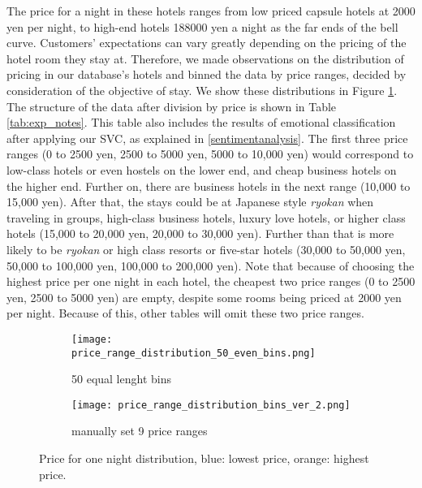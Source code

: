 \documentclass[smallextended,natbib]{svjour3}       %
\begin{document}
    The price for a night in these hotels ranges from low priced capsule hotels at 2000 yen per night, to high-end hotels \num[group-separator={,}]{188000} yen a night as the far ends of the bell curve. Customers' expectations can vary greatly depending on the pricing of the hotel room they stay at. Therefore, we made observations on the distribution of pricing in our database's hotels and binned the data by price ranges, decided by consideration of the objective of stay. We show these distributions in Figure \ref{fig:price_dist}. The structure of the data after division by price is shown in Table \ref{tab:exp_notes}. This table also includes the results of emotional classification after applying our SVC, as explained in \ref{sentimentanalysis}. The first three price ranges (0 to 2500 yen, 2500 to 5000 yen, 5000 to 10,000 yen) would correspond to low-class hotels or even hostels on the lower end, and cheap business hotels on the higher end. Further on, there are business hotels in the next range (10,000 to 15,000 yen). After that, the stays could be at Japanese style \textit{ryokan} when traveling in groups, high-class business hotels, luxury love hotels, or higher class hotels (15,000 to 20,000 yen, 20,000 to 30,000 yen). Further than that is more likely to be \textit{ryokan} or high class resorts or five-star hotels (30,000 to 50,000 yen, 50,000 to 100,000 yen, 100,000 to 200,000 yen). Note that because of choosing the highest price per one night in each hotel, the cheapest two price ranges (0 to 2500 yen, 2500 to 5000 yen) are empty, despite some rooms being priced at 2000 yen per night. Because of this, other tables will omit these two price ranges.

    \begin{figure}[ht]
        \centering
        \begin{subfigure}[b]{0.45\textwidth}
            \texttt{[image: price\_range\_distribution\_50\_even\_bins.png]}
            \caption{50 equal lenght bins}
        \end{subfigure}
        \begin{subfigure}[b]{0.45\textwidth}
            \texttt{[image: price\_range\_distribution\_bins\_ver\_2.png]}
            \caption{manually set 9 price ranges}
        \end{subfigure}
    \caption{Price for one night distribution, blue: lowest price, orange: highest price.}
    \label{fig:price_dist}
    \end{figure}
\end{document}
